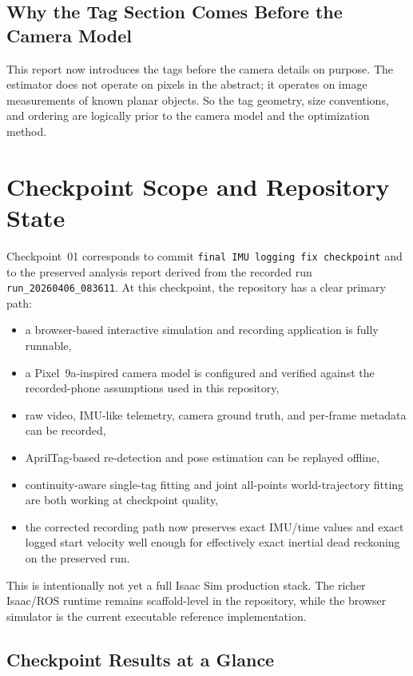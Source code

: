 \documentclass[11pt,a4paper]{article}
\newcommand{\runid}{\texttt{run\_20260406\_083611}}
\newcommand{\checkpointcommit}{\texttt{final IMU logging fix checkpoint}}
\begin{document}
\subsection{Why the Tag Section Comes Before the Camera Model}

This report now introduces the tags before the camera details on purpose.
The estimator does not operate on pixels in the abstract; it operates on image measurements of known planar objects.
So the tag geometry, size conventions, and ordering are logically prior to the camera model and the optimization method.

\section{Checkpoint Scope and Repository State}

Checkpoint~01 corresponds to commit \checkpointcommit{} and to the preserved analysis report derived from the recorded run \runid.
At this checkpoint, the repository has a clear primary path:

\begin{itemize}
  \item a browser-based interactive simulation and recording application is fully runnable,
  \item a Pixel~9a-inspired camera model is configured and verified against the recorded-phone assumptions used in this repository,
  \item raw video, IMU-like telemetry, camera ground truth, and per-frame metadata can be recorded,
  \item AprilTag-based re-detection and pose estimation can be replayed offline,
  \item continuity-aware single-tag fitting and joint all-points world-trajectory fitting are both working at checkpoint quality,
  \item the corrected recording path now preserves exact IMU/time values and exact logged start velocity well enough for effectively exact inertial dead reckoning on the preserved run.
\end{itemize}

This is intentionally not yet a full Isaac Sim production stack.
The richer Isaac/ROS runtime remains scaffold-level in the repository, while the browser simulator is the current executable reference implementation.

\subsection{Checkpoint Results at a Glance}
\end{document}
